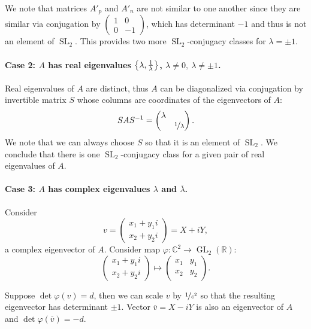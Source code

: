 \documentclass{article}
\theoremstyle{definition}
\newcommand{\R}{\mathbb{R}}
\newcommand{\C}{\mathbb{C}}
\newcommand{\GL}{\operatorname{GL}}
\newcommand{\SL}{\operatorname{SL}}
\DeclarePairedDelimiter\set{\{}{\}}
\begin{document}
We note that matrices $A'_p$ and $A'_n$ are not similar to one another since they are similar via conjugation by
$
    \begin{pmatrix}
        1 & 0 \\
        0 & -1
    \end{pmatrix}
$,
which has determinant $-1$ and thus is not an element of $\SL_2$.
This provides two more $\SL_2$-conjugacy classes for $\lambda = \pm 1$.

\paragraph{Case 2: $A$ has real eigenvalues $\set*{ \lambda, \frac{1}{\lambda} }$, $\lambda \neq 0, \> \lambda \neq \pm 1$.}
Real eigenvalues of $A$ are distinct, thus $A$ can be diagonalized via conjugation by invertible matrix $S$ whose columns are coordinates of the eigenvectors of $A$:
\[
    S A S^{-1} = 
    \begin{pmatrix}
        \lambda & \\
        & \nicefrac{1}{\lambda}
    \end{pmatrix}.
\]
We note that we can always choose $S$ so that it is an element of $\SL_2$.
We conclude that there is one $\SL_2$-conjugacy class for a given pair of real eigenvalues of $A$.

\paragraph{Case 3: $A$ has complex eigenvalues $\lambda$ and $\overline{\lambda}$.}

Consider 
\[
    v
    =
    \begin{pmatrix}
        x_1 + y_1 i \\
        x_2 + y_2 i
    \end{pmatrix}
    = X + iY,
\] 
a complex eigenvector of $A$.
Consider map $\varphi : \C^2 \to \GL_2(\R)$:
\[
    \begin{pmatrix}
        x_1 + y_1 i \\
        x_2 + y_2 i
    \end{pmatrix}
    \mapsto
    \begin{pmatrix}
        x_1 & y_1 \\
        x_2 & y_2
    \end{pmatrix}.
\]

Suppose $\det \varphi(v) = d$, then we can scale $v$ by $\nicefrac{1}{c^2}$ so that the resulting eigenvector has determinant $\pm 1$.
Vector $\overline{v} = X - iY$ is also an eigenvector of $A$ and $\det \varphi(\overline{v}) = -d$.
\end{document}
